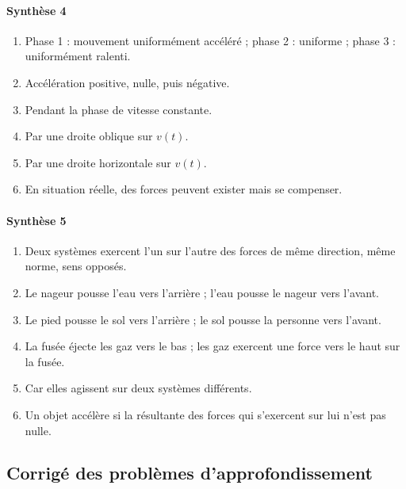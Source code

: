 \documentclass[11pt,a4paper]{article}
\theoremstyle{definition}
\begin{document}
\paragraph{Synthèse 4}
\begin{enumerate}[label=\arabic*.]
    \item Phase 1 : mouvement uniformément accéléré ; phase 2 : uniforme ; phase 3 : uniformément ralenti.
    \item Accélération positive, nulle, puis négative.
    \item Pendant la phase de vitesse constante.
    \item Par une droite oblique sur $v(t)$.
    \item Par une droite horizontale sur $v(t)$.
    \item En situation réelle, des forces peuvent exister mais se compenser.
\end{enumerate}

\paragraph{Synthèse 5}
\begin{enumerate}[label=\arabic*.]
    \item Deux systèmes exercent l’un sur l’autre des forces de même direction, même norme, sens opposés.
    \item Le nageur pousse l’eau vers l’arrière ; l’eau pousse le nageur vers l’avant.
    \item Le pied pousse le sol vers l’arrière ; le sol pousse la personne vers l’avant.
    \item La fusée éjecte les gaz vers le bas ; les gaz exercent une force vers le haut sur la fusée.
    \item Car elles agissent sur deux systèmes différents.
    \item Un objet accélère si la résultante des forces qui s’exercent sur lui n’est pas nulle.
\end{enumerate}

\subsection{Corrigé des problèmes d’approfondissement}
\end{document}
